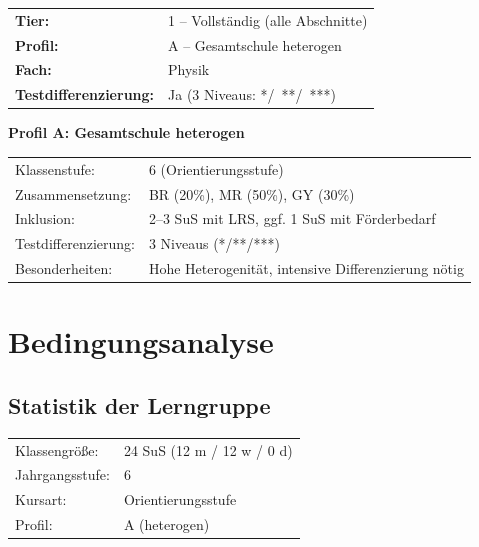 \documentclass[11pt,a4paper]{article}
\newcommand{\lerngruppenprofil}{A}
\newcommand{\jahrgangsstufe}{6}
\newcommand{\kursart}{Orientierungsstufe}
\newcommand{\lerngruppengroesse}{24}
\newcommand{\maennlich}{12}
\newcommand{\weiblich}{12}
\newcommand{\divers}{0}
\begin{document}
\begin{infobox}
\begin{tabular}{ll}
    \textbf{Tier:} & 1 -- Vollständig (alle Abschnitte) \\[0.3em]
    \textbf{Profil:} & A -- Gesamtschule heterogen \\[0.3em]
    \textbf{Fach:} & Physik \\[0.3em]
    \textbf{Testdifferenzierung:} & Ja (3 Niveaus: */~**/~***)
\end{tabular}
\end{infobox}

\begin{profilbox}
\textbf{Profil A: Gesamtschule heterogen}\\[0.5em]
\begin{tabular}{ll}
    Klassenstufe: & 6 (Orientierungsstufe) \\
    Zusammensetzung: & BR (20\%), MR (50\%), GY (30\%) \\
    Inklusion: & 2--3 SuS mit LRS, ggf. 1 SuS mit Förderbedarf \\
    Testdifferenzierung: & 3 Niveaus (*/**/***) \\
    Besonderheiten: & Hohe Heterogenität, intensive Differenzierung nötig
\end{tabular}
\end{profilbox}

\section{Bedingungsanalyse}

\subsection{Statistik der Lerngruppe}
\begin{tabular}{ll}
    Klassengröße: & \lerngruppengroesse{} SuS (\maennlich{} m / \weiblich{} w / \divers{} d) \\
    Jahrgangsstufe: & \jahrgangsstufe \\
    Kursart: & \kursart \\
    Profil: & \lerngruppenprofil{} (heterogen) \\
\end{tabular}
\end{document}

